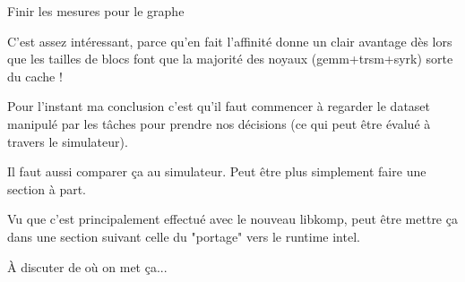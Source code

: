 \begin{todo}
Finir les mesures pour le graphe

C'est assez intéressant, parce qu'en fait l'affinité donne un clair avantage dès lors que les tailles de blocs font que la majorité des noyaux (gemm+trsm+syrk) sorte du cache !

Pour l'instant ma conclusion c'est qu'il faut commencer à regarder le dataset manipulé par les tâches pour prendre nos décisions (ce qui peut être évalué à travers le simulateur).
\end{todo}


\begin{todo}
  Il faut aussi comparer ça au simulateur. Peut être plus simplement faire une section à part.

  Vu que c'est principalement effectué avec le nouveau libkomp, peut être mettre ça dans une section suivant celle du "portage" vers le runtime intel.

  À discuter de où on met ça...
\end{todo}


